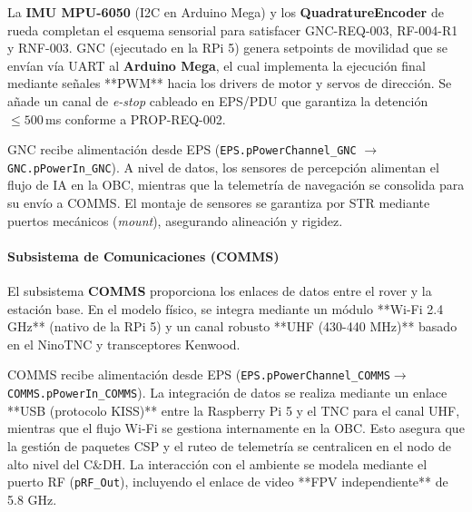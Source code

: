 La \textbf{IMU MPU-6050} (I2C en Arduino Mega) y los \textbf{QuadratureEncoder} de rueda completan el esquema sensorial para satisfacer GNC-REQ-003, RF-004-R1 y RNF-003. GNC (ejecutado en la RPi 5) genera setpoints de movilidad que se envían vía UART al \textbf{Arduino Mega}, el cual implementa la ejecución final mediante señales **PWM** hacia los drivers de motor y servos de dirección. Se añade un canal de \emph{e-stop} cableado en EPS/PDU que garantiza la detención $\le 500$\,ms conforme a PROP-REQ-002.

GNC recibe alimentación desde EPS (\texttt{EPS.pPowerChannel\_GNC} $\rightarrow$ \texttt{GNC.pPowerIn\_GNC}). A nivel de datos, los sensores de percepción alimentan el flujo de IA en la OBC, mientras que la telemetría de navegación se consolida para su envío a COMMS. El montaje de sensores se garantiza por STR mediante puertos mecánicos (\textit{mount}), asegurando alineación y rigidez.

\paragraph{Subsistema de Comunicaciones (COMMS)}
El subsistema \textbf{COMMS} proporciona los enlaces de datos entre el rover y la estación base. En el modelo físico, se integra mediante un módulo **Wi-Fi 2.4 GHz** (nativo de la RPi 5) y un canal robusto **UHF (430-440 MHz)** basado en el NinoTNC y transceptores Kenwood. 

COMMS recibe alimentación desde EPS (\texttt{EPS.\allowbreak pPowerChannel\_\allowbreak COMMS}\linebreak[0] $\rightarrow$ \texttt{COMMS.\allowbreak pPowerIn\_\allowbreak COMMS}). La integración de datos se realiza mediante un enlace **USB (protocolo KISS)** entre la Raspberry Pi 5 y el TNC para el canal UHF, mientras que el flujo Wi-Fi se gestiona internamente en la OBC. Esto asegura que la gestión de paquetes CSP y el ruteo de telemetría se centralicen en el nodo de alto nivel del C\&DH. La interacción con el ambiente se modela mediante el puerto RF (\texttt{pRF\_Out}), incluyendo el enlace de video **FPV independiente** de 5.8 GHz.

